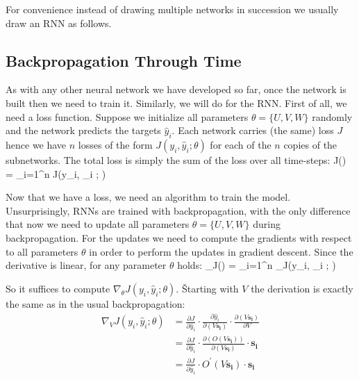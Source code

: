 For convenience instead of drawing multiple networks in succession we usually draw an RNN as follows.

\vspace{-5pt}


\subsection{Backpropagation Through Time}

As with any other neural network we have developed so far, once the network is built then we need to train it.
Similarly, we will do for the RNN. First of all, we need a loss function. Suppose we initialize all parameters
$\theta = \{U, V, W\}$ randomly and the network predicts the targets $\hat{y}_i$. Each network carries (the same)
loss $J$ hence we have $n$ losses of the form $J(y_i, \hat{y}_i ; \theta)$ for each of the $n$ copies of the
subnetworks. The total loss is simply the sum of the loss over all time-steps:
\bse
J(\theta) = \sum_{i=1}^{n} J(y_i, _i ; \theta)
\ese

Now that we have a loss, we need an algorithm to train the model. Unsurprisingly, RNNs are trained with
backpropagation, with the only difference that now we need to update all parameters $\theta = \{U, V, W\}$ during
backpropagation. For the updates we need to compute the gradients with respect to all parameters $\theta$ in order to
perform the updates in gradient descent. Since the derivative is linear, for any parameter $\theta$ holds:
\bse
\nabla_\theta J(\theta) = \sum_{i=1}^{n} \nabla_\theta J(y_i, _i ; \theta)
\ese

So it suffices to compute $\nabla_\theta J(y_i, \hat{y}_i ; \theta)$. \v

Starting with $V$ the derivation is exactly the same as in the usual backpropagation:
{\setlength{\jot}{5pt}
\begin{align*}
\nabla_V J(y_i, \hat{y}_i ; \theta)& = \frac{\partial J}{\partial \hat{y}_i}
\cdot \frac{\partial \hat{y}_i}{\partial (V \boldsymbol{s_i})} \cdot \frac{\partial (V \boldsymbol{s_i})}{\partial V} \\
& = \frac{\partial J}{\partial \hat{y}_i}
\cdot \frac{ \partial ( O(V \boldsymbol{s_i}))}{\partial (V\boldsymbol{s_i})} \cdot \boldsymbol{s_i}\\
& = \frac{\partial J}{\partial \hat{y}_i} \cdot O^\prime(V \boldsymbol{s_i}) \cdot \boldsymbol{s_i}
\end{align*}}

